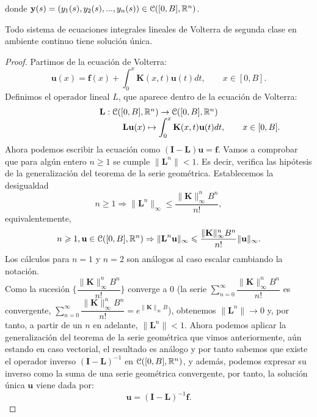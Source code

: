 donde $\textbf{y}(s) = (y_1(s),y_2(s),...,y_n(s)) \in \mathcal{C}([0,B],\mathbb{R}^n)$.
\begin{corolario}
	Todo sistema de ecuaciones integrales lineales de Volterra de segunda clase en ambiente continuo tiene solución única.
\end{corolario}
\begin{proof}
	Partimos de la ecuación de Volterra:
	\begin{equation}
		\textbf{u}(x) = \textbf{f}(x) + \int_0^x \textbf{K}(x,t)\textbf{u}(t)dt, \qquad x \in [0,B].
	\end{equation}
	Definimos el operador lineal $L$, que aparece dentro de la ecuación de Volterra:
	\begin{equation}
		\begin{array}{c}
			\textbf{L}: \mathcal{C}([0,B],\mathbb{R}^n) \rightarrow \mathcal{C}([0,B],\mathbb{R}^n) \\
			\qquad \qquad \qquad \qquad \qquad \textbf{L}\textbf{u}(x) \mapsto \displaystyle \int_{0}^{x} \textbf{K}(x,t)\textbf{u}(t)dt, \qquad x \in [0,B].
		\end{array}
	\end{equation}
	Ahora podemos escribir la ecuación como $(\textbf{I}-\textbf{L})\textbf{u} = \textbf{f}$.
	Vamos a comprobar que para algún entero $n \geqslant 1$ se cumple $\lVert \textbf{L}^n \rVert < 1$. Es decir, verifica las hipótesis de la generalización del teorema de la serie geométrica. Establecemos la desigualdad
	\begin{equation}
		n \geqslant 1 \Rightarrow \lVert \textbf{L}^n \rVert_\infty \leqslant \dfrac{\lVert \textbf{K} \rVert_\infty^nB^n}{n!},
	\end{equation}
	equivalentemente,
	\begin{equation}\label{eq:ref2}
		n \geqslant 1, \textbf{u} \in \mathcal{C}([0,B],\mathbb{R}^n) \Rightarrow \lVert \textbf{L}^n\textbf{u} \rVert_\infty \leqslant \dfrac{\lVert \textbf{K} \rVert_\infty^nB^n}{n!}\lVert \textbf{u} \rVert_\infty.
	\end{equation}
	Los cálculos para $n = 1$ y $n = 2$ son análogos al caso escalar cambiando la notación.\\
	
	Como la sucesión $\{\dfrac{\lVert \textbf{K} \rVert_\infty^nB^n}{n!}\}$ converge a $0$ (la serie $\displaystyle \sum_{n=0}^{\infty}\dfrac{\lVert \textbf{K} \rVert_\infty^nB^n}{n!}$ es convergente, $\displaystyle \sum_{n=0}^{\infty}\dfrac{\lVert \textbf{K} \rVert_\infty^nB^n}{n!} = e^{\lVert \textbf{K} \rVert_\infty B}$), obtenemos $\lVert \textbf{L}^n \rVert \rightarrow 0$ y, por tanto, a partir de un $n$ en adelante, $\lVert \textbf{L}^n \rVert < 1$.
	Ahora podemos aplicar la generalización del teorema de la serie geométrica que vimos anteriormente, aún estando en caso vectorial, el resultado es análogo y por tanto sabemos que existe el operador inverso $(\textbf{I}-\textbf{L})^{-1}$ en $\mathcal{C}([0,B],\mathbb{R}^n)$, y además, podemos expresar su inverso como la suma de una serie geométrica convergente, por tanto, la solución única $\textbf{u}$ viene dada por:
	\begin{equation}
		\textbf{u} = (\textbf{I}-\textbf{L})^{-1}\textbf{f}.
	\end{equation}
\end{proof}
